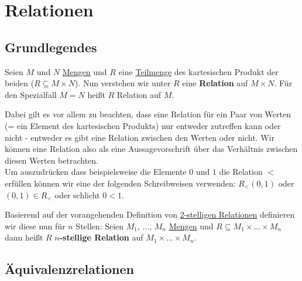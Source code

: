 \documentclass[../../main.tex]{subfiles}
\begin{document}
	
	\chapter{Relationen}
	
	\section{Grundlegendes}
	
	\begin{definition}
		\label{def:Relation}
		Seien $M$ und $N$ \hyperref[def:Menge]{Mengen} und $R$ eine \hyperref[def:Teilmenge]{Teilmenge} des kartesischen Produkt der beiden ($R \subseteq M \times N$). Nun verstehen wir unter $R$ eine \textbf{Relation} auf $M \times N$. Für den Spezialfall $M=N$ heißt $R$ Relation auf $M$.
	\end{definition}

	Dabei gilt es vor allem zu beachten, dass eine Relation für ein Paar von Werten (= ein Element des kartesischen Produkts) nur entweder zutreffen kann oder nicht - entweder es gibt eine Relation zwischen den Werten oder nicht. Wir können eine Relation also als eine Aussagevorschrift über das Verhältnis zwischen diesen Werten betrachten.\\
	
	
	Um auszudrücken dass beispielsweise die Elemente $0$ und $1$ die Relation $<$ erfüllen können wir eine der folgenden Schreibweisen verwenden: $R_<(0,1)$ oder $(0,1) \in R_<$ oder schlicht $0<1$.
	
	\begin{definition}
		\label{def:nStelligeRelation}
		Basierend auf der vorangehenden Definition von \hyperref[def:Relation]{2-stelligen Relationen} definieren wir diese nun für $n$ Stellen: Seien $M_1$, ..., $M_n$ \hyperref[def:Menge]{Mengen} und $R \subseteq M_1 \times ... \times M_n$ dann heißt $R$ \textbf{$n$-stellige Relation} auf $M_1 \times ... \times M_n$.
	\end{definition}

	\section{Äquivalenzrelationen}
\end{document}
